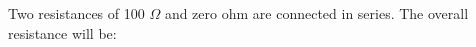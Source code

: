 Two resistances of 100 $\Omega$ and zero ohm are connected in series. 
The overall resistance will be: